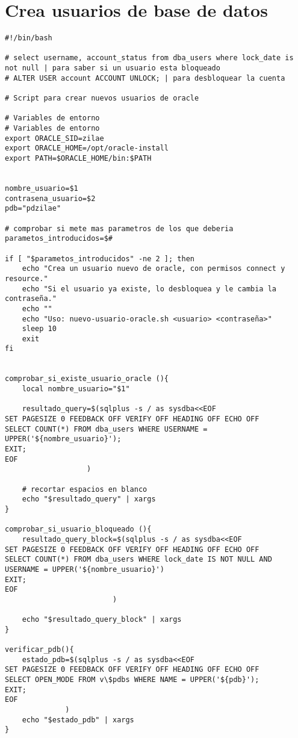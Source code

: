 \documentclass[11pt]{article}
\begin{document}
\section{Crea usuarios de base de datos}
\label{sec:org6a73307}
\begin{verbatim}
#!/bin/bash

# select username, account_status from dba_users where lock_date is not null | para saber si un usuario esta bloqueado
# ALTER USER account ACCOUNT UNLOCK; | para desbloquear la cuenta

# Script para crear nuevos usuarios de oracle

# Variables de entorno
# Variables de entorno
export ORACLE_SID=zilae
export ORACLE_HOME=/opt/oracle-install
export PATH=$ORACLE_HOME/bin:$PATH


nombre_usuario=$1
contrasena_usuario=$2
pdb="pdzilae"

# comprobar si mete mas parametros de los que deberia
parametos_introducidos=$#

if [ "$parametos_introducidos" -ne 2 ]; then
    echo "Crea un usuario nuevo de oracle, con permisos connect y resource."
    echo "Si el usuario ya existe, lo desbloquea y le cambia la contraseña."
    echo ""
    echo "Uso: nuevo-usuario-oracle.sh <usuario> <contraseña>"
    sleep 10
    exit
fi


comprobar_si_existe_usuario_oracle (){
    local nombre_usuario="$1"

    resultado_query=$(sqlplus -s / as sysdba<<EOF
SET PAGESIZE 0 FEEDBACK OFF VERIFY OFF HEADING OFF ECHO OFF
SELECT COUNT(*) FROM dba_users WHERE USERNAME = UPPER('${nombre_usuario}');
EXIT;
EOF
                   )

    # recortar espacios en blanco
    echo "$resultado_query" | xargs
}

comprobar_si_usuario_bloqueado (){
    resultado_query_block=$(sqlplus -s / as sysdba<<EOF
SET PAGESIZE 0 FEEDBACK OFF VERIFY OFF HEADING OFF ECHO OFF
SELECT COUNT(*) FROM dba_users WHERE lock_date IS NOT NULL AND USERNAME = UPPER('${nombre_usuario}')
EXIT;
EOF
                         )

    echo "$resultado_query_block" | xargs
}

verificar_pdb(){
    estado_pdb=$(sqlplus -s / as sysdba<<EOF
SET PAGESIZE 0 FEEDBACK OFF VERIFY OFF HEADING OFF ECHO OFF
SELECT OPEN_MODE FROM v\$pdbs WHERE NAME = UPPER('${pdb}');
EXIT;
EOF
              )
    echo "$estado_pdb" | xargs
}


\end{verbatim}
\end{document}
